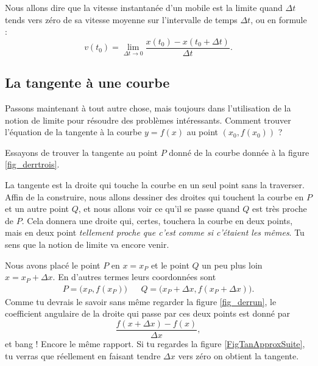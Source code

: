 \documentclass{article}
\begin{document}
Nous allons dire que la vitesse instantanée d'un mobile est la limite quand $\Delta t$ tends vers zéro de sa vitesse moyenne sur l'intervalle de temps $\Delta t$, ou en formule :
\begin{equation}		\label{Eqvinstlimite}
	v(t_0)=\lim_{\Delta t\to 0}\frac{ x(t_0)-x(t_0+\Delta t) }{ \Delta t }.
\end{equation}

					\subsection{La tangente à une courbe}

Passons maintenant à tout autre chose, mais toujours dans l'utilisation de la notion de limite pour résoudre des problèmes intéressants. Comment trouver l'équation de la tangente à la courbe $y=f(x)$ au point $(x_0,f(x_0))$ ?

Essayons de trouver la tangente au point $P$ donné de la courbe donnée à la figure \ref{fig_derrtrois}.







La tangente est la droite qui touche la courbe en un seul point sans la traverser. Affin de la construire, nous allons dessiner des droites qui touchent la courbe en $P$ et un autre point $Q$, et nous allons voir ce qu'il se passe quand $Q$ est très proche de $P$. Cela donnera une droite qui, certes, touchera la courbe en deux points, mais en deux point \emph{tellement proche que c'est comme si c'étaient les mêmes}. Tu sens que la notion de limite va encore venir.

Nous avons placé le point $P$ en $x=x_P$ et le point $Q$ un peu plus loin $x=x_P+\Delta x$. En d'autres termes leurs coordonnées sont
\begin{align}
	P=\big(x_P,f(x_P)\big)&& Q=\big(x_P+\Delta x,f(x_P+\Delta x)\big).
\end{align}
Comme tu devrais le savoir sans même regarder la figure \ref{fig_derrun}, le coefficient angulaire de la droite qui passe par ces deux points est donné par
\begin{equation}
	\frac{ f(x+\Delta x)-f(x) }{ \Delta x },
\end{equation}
et bang ! Encore le même rapport. Si tu regardes la figure \ref{FigTanApproxSuite}, tu verras que réellement en faisant tendre $\Delta x$ vers zéro on obtient la tangente.
\end{document}
